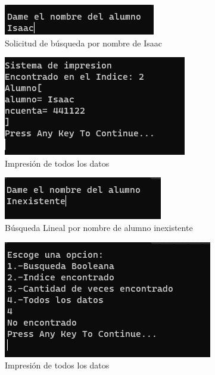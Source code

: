 \documentclass{report}
\begin{document}
\begin{figure}
    \centering
    \includegraphics[width=1\linewidth]{Imagen21.png}
    \caption{Solicitud de búsqueda por nombre de Isaac}
    
\end{figure}
\begin{figure}
    \centering
    \includegraphics[width=1\linewidth]{Imagen22.png}
    \caption{Impresión de todos los datos}
    
\end{figure}
\begin{figure}
    \centering
    \includegraphics[width=1\linewidth]{Imagen23.png}
    \caption{Búsqueda Lineal por nombre de alumno inexistente }
\end{figure}
\begin{figure}
    \centering
    \includegraphics[width=1\linewidth]{Imagen24.png}
    \caption{Impresión de todos los datos}
\end{figure}
\end{document}

